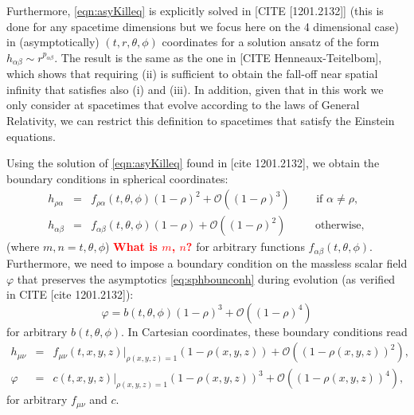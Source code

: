 \documentclass[a4paper,11pt]{article}
\numberwithin{equation}{section}
\begin{document}
Furthermore, \eqref{eqn:asyKilleq} is explicitly solved in [CITE [1201.2132]] (this is done for any spacetime dimensions but we focus here on the 4 dimensional case) in (asymptotically) $(t,r,\theta,\phi)$ coordinates for a solution ansatz of the form $h_{\alpha\beta}\sim r^{p_{\alpha\beta}}$. The result is the same as the one in [CITE Henneaux-Teitelbom], which shows that requiring (ii) is sufficient to obtain the fall-off near spatial infinity that satisfies also (i) and (iii).
In addition, given that in this work we only consider at spacetimes that evolve according to the laws of General Relativity, we can restrict this definition to spacetimes that satisfy the Einstein equations.

Using the solution of \eqref{eqn:asyKilleq} found in [cite 1201.2132], we obtain the boundary conditions in spherical coordinates:
\begin{eqnarray}
\label{eq:sphbounconh}
h_{\rho\alpha}&=&f_{\rho\alpha}(t,\theta,\phi)(1-\rho)^2+\mathcal{O}((1-\rho)^3) \qquad \textrm{ if $\alpha\neq\rho$}, \\ \nonumber
h_{\alpha\beta}&=&f_{\alpha\beta}(t,\theta,\phi)(1-\rho)+\mathcal{O}((1-\rho)^{2}) \qquad\; \textrm{ otherwise},
\end{eqnarray}
(where $m,n=t,\theta,\phi$) \textcolor{red}{\bf What is $m$, $n$?} for arbitrary functions $f_{\alpha\beta}(t,\theta,\phi)$. Furthermore, we need to impose a boundary condition on the massless scalar field $\varphi$ that preserves the asymptotics \eqref{eq:sphbounconh} during evolution (as verified in CITE [cite 1201.2132]):
\begin{equation}\label{eq:sphbounconphi}
\varphi=b(t,\theta,\phi)(1-\rho)^3+\mathcal{O}((1-\rho)^4)
\end{equation}
for arbitrary $b(t,\theta,\phi)$. In Cartesian coordinates, these boundary conditions read
\begin{eqnarray}
\label{eq:carbouncondh}
h_{\mu\nu}&=&f_{\mu\nu}(t,x,y,z)|_{\rho(x,y,z)=1}(1-\rho(x,y,z))+\mathcal{O}((1-\rho(x,y,z))^{2}), \\
\label{eq:carbouncondphi}
\varphi&=&c(t,x,y,z)|_{\rho(x,y,z)=1}(1-\rho(x,y,z))^3+\mathcal{O}((1-\rho(x,y,z))^{4}), 
\end{eqnarray}
for arbitrary $f_{\mu\nu}$ and $c$.
\end{document}
